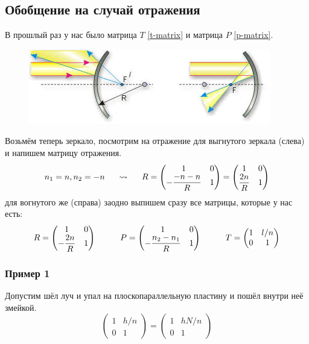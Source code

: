 \subsection*{Обобщение на случай отражения}

В прошлый раз у нас было матрица $T$ \eqref{t-matrix} и матрица $P$ \eqref{p-matrix}.

\begin{figure}[htb]
	\centering
	\includegraphics{img/otrazenie.png}
\end{figure}

Возьмём теперь зеркало, посмотрим на отражение для выгнутого зеркала (слева) и напишем матрицу отражения.
\begin{equation*}
	n_1 = n, n_2 = -n
	\hspace{0.5 cm}
	\leadsto
	\hspace{0.5 cm}
	R = \begin{pmatrix}
		1 & 0 \\ -\dfrac{- n -n}{R} & 1
	\end{pmatrix}
	=
	\begin{pmatrix}
		1 & 0 \\ \dfrac{2n}{R} & 1
	\end{pmatrix}
\end{equation*}
для вогнутого же (справа) заодно выпишем сразу все матрицы, которые у нас есть:
\begin{equation*}
	R = \begin{pmatrix}
		1 & 0 \\ -\dfrac{2n}{R} & 1
	\end{pmatrix}
	\hspace{1 cm}
	P= \begin{pmatrix}
		1 & 0 \\ -\dfrac{n_2 - n_1}{R} & 1
	\end{pmatrix}
	\hspace{1 cm}
	T = \begin{pmatrix}
		1 & l/n \\
		0 & 1
	\end{pmatrix}
\end{equation*}

\subsubsection*{Пример 1}
Допустим шёл луч и упал на плоскопараллельную пластину и пошёл внутри неё змейкой.
\begin{equation*}
	\begin{pmatrix}
		1 & h/n \\ 0 & 1
	\end{pmatrix}
	=
	\begin{pmatrix}
		1 & h N/n \\ 0 & 1
	\end{pmatrix}
\end{equation*}

